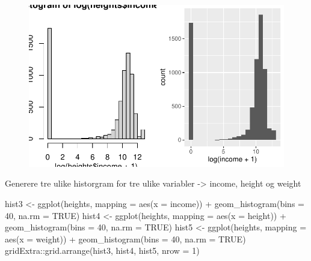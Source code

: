 \documentclass[
  letterpaper,
  DIV=11,
  numbers=noendperiod]{scrartcl}
\newenvironment{Shaded}{\begin{snugshade}}{\end{snugshade}}
\newcommand{\AttributeTok}[1]{\textcolor[rgb]{0.40,0.45,0.13}{#1}}
\newcommand{\ConstantTok}[1]{\textcolor[rgb]{0.56,0.35,0.01}{#1}}
\newcommand{\DecValTok}[1]{\textcolor[rgb]{0.68,0.00,0.00}{#1}}
\newcommand{\FunctionTok}[1]{\textcolor[rgb]{0.28,0.35,0.67}{#1}}
\newcommand{\NormalTok}[1]{\textcolor[rgb]{0.00,0.23,0.31}{#1}}
\newcommand{\OtherTok}[1]{\textcolor[rgb]{0.00,0.23,0.31}{#1}}
\newcommand{\SpecialCharTok}[1]{\textcolor[rgb]{0.37,0.37,0.37}{#1}}
\begin{document}
\begin{figure}[H]

{\centering \includegraphics{EDA_files/figure-pdf/unnamed-chunk-15-1.pdf}

}

\end{figure}

Generere tre ulike historgram for tre ulike variabler -\textgreater{}
income, height og weight

\begin{Shaded}
\begin{Highlighting}[]
\NormalTok{hist3 }\OtherTok{\textless{}{-}} \FunctionTok{ggplot}\NormalTok{(heights, }\AttributeTok{mapping =} \FunctionTok{aes}\NormalTok{(}\AttributeTok{x =}\NormalTok{ income)) }\SpecialCharTok{+}
  \FunctionTok{geom\_histogram}\NormalTok{(}\AttributeTok{bins =} \DecValTok{40}\NormalTok{, }\AttributeTok{na.rm =} \ConstantTok{TRUE}\NormalTok{)}
\NormalTok{hist4 }\OtherTok{\textless{}{-}} \FunctionTok{ggplot}\NormalTok{(heights, }\AttributeTok{mapping =} \FunctionTok{aes}\NormalTok{(}\AttributeTok{x =}\NormalTok{ height)) }\SpecialCharTok{+}
  \FunctionTok{geom\_histogram}\NormalTok{(}\AttributeTok{bins =} \DecValTok{40}\NormalTok{, }\AttributeTok{na.rm =} \ConstantTok{TRUE}\NormalTok{)}
\NormalTok{hist5 }\OtherTok{\textless{}{-}} \FunctionTok{ggplot}\NormalTok{(heights, }\AttributeTok{mapping =} \FunctionTok{aes}\NormalTok{(}\AttributeTok{x =}\NormalTok{ weight)) }\SpecialCharTok{+}
  \FunctionTok{geom\_histogram}\NormalTok{(}\AttributeTok{bins =} \DecValTok{40}\NormalTok{, }\AttributeTok{na.rm =} \ConstantTok{TRUE}\NormalTok{)}
\NormalTok{gridExtra}\SpecialCharTok{::}\FunctionTok{grid.arrange}\NormalTok{(hist3, hist4, hist5, }\AttributeTok{nrow =} \DecValTok{1}\NormalTok{)}
\end{Highlighting}
\end{Shaded}
\end{document}
